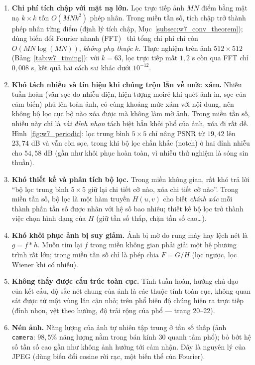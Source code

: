 \begin{enumerate}
    \item \textbf{Chi phí tích chập với mặt nạ lớn.} Lọc trực tiếp ảnh $MN$ điểm bằng mặt nạ $k \times k$ tốn $O(MNk^2)$ phép nhân. Trong miền tần số, tích chập trở thành phép nhân từng điểm (định lý tích chập, Mục~\ref{subsec:w7_conv_theorem}); dùng biến đổi Fourier nhanh (FFT)~\citep{cooley1965algorithm} thì tổng chi phí chỉ còn $O(MN \log(MN))$, \emph{không phụ thuộc} $k$. Thực nghiệm trên ảnh $512 \times 512$ (Bảng~\ref{tab:w7_timing}): với $k = 63$, lọc trực tiếp mất $1{,}2$ s còn qua FFT chỉ $0{,}008$ s, kết quả hai cách sai khác dưới $10^{-12}$.
    \item \textbf{Khó tách nhiễu và tín hiệu khi chúng trộn lẫn về mức xám.} Nhiễu tuần hoàn (vân sọc do nhiễu điện, hiện tượng moiré khi quét ảnh in, sọc của cảm biến) phủ lên toàn ảnh, có cùng khoảng mức xám với nội dung, nên không bộ lọc cục bộ nào xóa được mà không làm mờ ảnh. Trong miền tần số, nhiễu này chỉ là \emph{vài đỉnh nhọn} tách biệt hẳn khỏi phổ của ảnh, xóa đi rất dễ. Hình~\ref{fig:w7_periodic}: lọc trung bình $5 \times 5$ chỉ nâng PSNR từ $19{,}42$ lên $23{,}74$ dB và vẫn còn sọc, trong khi bộ lọc chắn khấc (notch) ở hai đỉnh nhiễu cho $54{,}58$ dB (gần như khôi phục hoàn toàn, vì nhiễu thử nghiệm là sóng sin thuần).
    \item \textbf{Khó thiết kế và phân tích bộ lọc.} Trong miền không gian, rất khó trả lời ``bộ lọc trung bình $5 \times 5$ giữ lại chi tiết cỡ nào, xóa chi tiết cỡ nào''. Trong miền tần số, bộ lọc là một hàm truyền $H(u, v)$ cho biết \emph{chính xác} mỗi thành phần tần số được nhân với hệ số bao nhiêu; thiết kế bộ lọc trở thành việc chọn hình dạng của $H$ (giữ tần số thấp, chặn tần số cao\ldots).
    \item \textbf{Khó khôi phục ảnh bị suy giảm.} Ảnh bị mờ do rung máy hay lệch nét là $g = f * h$. Muốn tìm lại $f$ trong miền không gian phải giải một hệ phương trình rất lớn; trong miền tần số chỉ là phép chia $F = G/H$ (lọc ngược, lọc Wiener khi có nhiễu).
    \item \textbf{Không thấy được cấu trúc toàn cục.} Tính tuần hoàn, hướng chủ đạo của kết cấu, độ sắc nét chung của ảnh là các thuộc tính toàn cục, không quan sát được từ một vùng lân cận nhỏ; trên phổ biên độ chúng hiện ra trực tiếp (đỉnh nhọn, vệt theo hướng, độ trải rộng của phổ — trang 20--22).
    \item \textbf{Nén ảnh.} Năng lượng của ảnh tự nhiên tập trung ở tần số thấp (ảnh \texttt{camera}: $98{,}5\%$ năng lượng nằm trong bán kính $30$ quanh tâm phổ); bỏ bớt hệ số tần số cao gần như không ảnh hưởng tới cảm nhận. Đây là nguyên lý của JPEG (dùng biến đổi cosine rời rạc, một biến thể của Fourier).
\end{enumerate}

